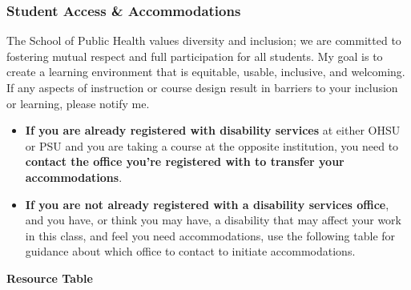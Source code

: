 \documentclass[
  letterpaper,
  DIV=11,
  numbers=noendperiod]{scrartcl}
\begin{document}
\hypertarget{student-access-accommodations}{%
\subsubsection{Student Access \&
Accommodations}\label{student-access-accommodations}}

The School of Public Health values diversity and inclusion; we are
committed to fostering mutual respect and full participation for all
students. My goal is to create a learning environment that is equitable,
usable, inclusive, and welcoming. If any aspects of instruction or
course design result in barriers to your inclusion or learning, please
notify me.~

\begin{itemize}
\item
  \textbf{If you are already registered with disability services} at
  either OHSU or PSU and you are taking a course at the opposite
  institution, you need to \textbf{contact the office you're registered
  with to transfer your accommodations}.
\item
  \textbf{If you are not already registered with a disability services
  office}, and you have, or think you may have, a disability that may
  affect your work in this class, and feel you need accommodations, use
  the following table for guidance about which office to contact to
  initiate accommodations.
\end{itemize}

\textbf{Resource Table}
\end{document}

